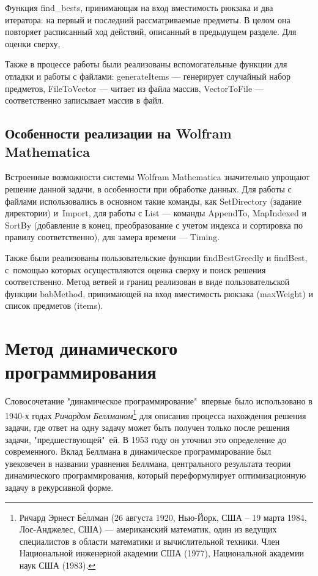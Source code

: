 \documentclass[12pt, a4paper]{article}
\begin{document}
	Функция find\_bests, принимающая на вход вместимость рюкзака и два итератора: на первый и последний рассматриваемые предметы. В целом она повторяет расписанный ход действий, описанный в предыдущем разделе. Для оценки сверху, 
	
	Также в процессе работы были реализованы вспомогательные функции для отладки и работы с файлами: generateItems --- генерирует случайный набор предметов, FileToVector --- читает из файла массив, VectorToFile --- соответственно записывает массив в файл.
	
	\subsection{Особенности реализации на Wolfram Mathematica}
	Встроенные возможности системы Wolfram Mathematica значительно упрощают решение данной задачи, в особенности при обработке данных. Для работы с файлами использовались в основном такие команды, как SetDirectory (задание директории) и~Import, для работы с List --- команды AppendTo, MapIndexed и SortBy (добавление в конец, преобразование с учетом индекса и сортировка по правилу соответственно), для замера времени --- Timing. 
	
	Также были реализованы пользовательские функции findBestGreedly и findBest, с~помощью которых осуществляются оценка сверху и поиск решения соответственно. Метод ветвей и границ реализован в виде пользовательской функции babMethod, принимающей на вход вместимость рюкзака (maxWeight) и список предметов (items).
	
	\section{Метод динамического программирования}
	Словосочетание "динамическое программирование"\, впервые было использовано в 1940-х годах \textit{Ричардом Беллманом}\footnote{Ричард Эрнест Б\'{е}ллман (26 августа 1920, Нью-Йорк, США -- 19 марта 1984, Лос-Анджелес, США) --- американский математик, один из ведущих специалистов в области математики и вычислительной техники. Член Национальной инженерной академии США (1977), Национальной академии наук США (1983).} для описания процесса нахождения решения задачи, где ответ на одну задачу может быть получен только после решения задачи, "предшествующей"\, ей. В 1953 году он уточнил это определение до современного. Вклад Беллмана в динамическое программирование был увековечен в названии уравнения Беллмана, центрального результата теории динамического программирования, который переформулирует оптимизационную задачу в рекурсивной форме.
	
\end{document}
